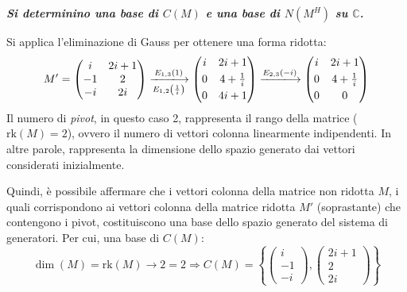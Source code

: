 \documentclass[a4paper]{article}
\makeatletter
\newenvironment{rowequmat}[1]{\left(\array{@{}#1@{}}}{\endarray\right)}
\makeatother
\begin{document}
	\textcolor{Green4}{\textbf{\emph{Si determinino una base di $C\left(M\right)$ e una base di $N\left(M^{H}\right)$ su $\mathbb{C}$.}}}\newline

	\noindent
	Si applica l'eliminazione di Gauss per ottenere una forma ridotta:
	\begin{equation*}
		M' =
		\begin{pmatrix}
			i	& 2i+1	\\
			-1	& 2		\\
			-i	& 2i
		\end{pmatrix}
		\xlongrightarrow[E_{1,2}\left(\frac{1}{i}\right)]{E_{1,3}\left(1\right)}
		\begin{rowequmat}{cc}
			i	& 2i+1 \\ [.3em]
			0	& 4+\frac{1}{i} \\ [.3em]
			0	& 4i+1
		\end{rowequmat}
		\xlongrightarrow{E_{2,3}\left(-i\right)}
		\begin{rowequmat}{cc}
			i	& 2i+1 \\ [.3em]
			0	& 4+\frac{1}{i} \\ [.3em]
			0	& 0
		\end{rowequmat}
	\end{equation*}
	Il numero di \emph{pivot}, in questo caso 2, rappresenta il rango della matrice ($\mathrm{rk}\left(M\right) = 2$), ovvero il numero di vettori colonna linearmente indipendenti. In altre parole, rappresenta la dimensione dello spazio generato dai vettori considerati inizialmente.

	Quindi, è possibile affermare che i vettori colonna della matrice non ridotta $M$, i quali corrispondono ai vettori colonna della matrice ridotta $M'$ (soprastante) che contengono i pivot, costituiscono una base dello spazio generato del sistema di generatori. Per cui, una base di $C\left(M\right)$:
	\begin{equation*}
		\dim\left(M\right) = \mathrm{rk}\left(M\right) \longrightarrow 2 = 2 \Longrightarrow
		C\left(M\right) = \left\{
			\begin{pmatrix}
				i  \\
				-1 \\
				-i
			\end{pmatrix},
			\begin{pmatrix}
				2i+1 \\
				2 	 \\
				2i
			\end{pmatrix}
		\right\}
	\end{equation*}\newpage
\end{document}
